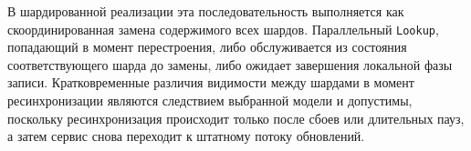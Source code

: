 В шардированной реализации эта последовательность выполняется как
скоординированная замена содержимого всех шардов. Параллельный
\texttt{Lookup}, попадающий в момент перестроения, либо обслуживается из
состояния соответствующего шарда до замены, либо ожидает завершения
локальной фазы записи. Кратковременные различия видимости между шардами в
момент ресинхронизации являются следствием выбранной модели и допустимы,
поскольку ресинхронизация происходит только после сбоев или длительных
пауз, а затем сервис снова переходит к штатному потоку обновлений.

